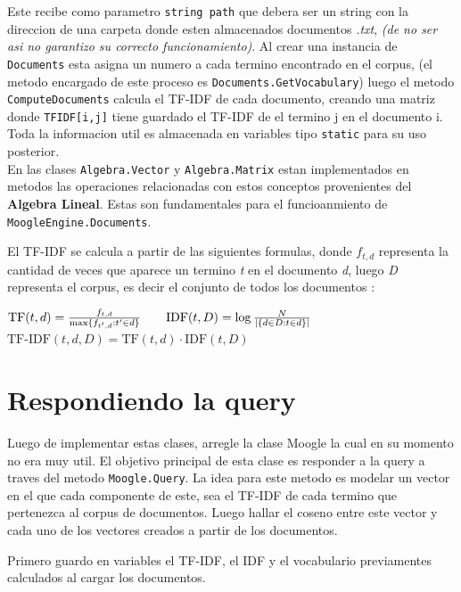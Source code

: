 \documentclass[10pt,a4paper]{report}
\begin{document}
\begin{flushleft}

    Este recibe como parametro \texttt{string path} que debera ser un string con la direccion de una carpeta donde esten almacenados documentos \emph{.txt}, \textit{(de no ser asi no garantizo su correcto funcionamiento)}. Al crear una instancia de \texttt{Documents} esta asigna un numero a cada termino encontrado en el corpus, (el metodo encargado de este proceso es \texttt{Documents.GetVocabulary}) luego el metodo \texttt{ComputeDocuments} calcula el TF-IDF de cada documento, creando una matriz donde \texttt{TFIDF[i,j]} tiene guardado el TF-IDF de el termino j en el documento i. Toda la informacion util es almacenada en variables tipo \texttt{static} para su uso posterior.\\

    En las clases \texttt{Algebra.Vector} y \texttt{Algebra.Matrix} estan implementados en metodos las operaciones relacionadas con estos conceptos provenientes del \textbf{Algebra Lineal}. Estas son fundamentales para el funcioanmiento de \texttt{MoogleEngine.Documents}.

    \vspace{10pt}
    
    El TF-IDF se calcula a partir de las siguientes formulas, donde \emph{$f_{t,d}$} representa la cantidad de veces que aparece un termino \emph{t} en el documento \emph{d}, luego \emph{D} representa el corpus, es decir el conjunto de todos los documentos :

\end{flushleft}

\begin{center}
    \begin{large}
        $
        \mathrm{TF}(t,d) = \frac{f_{t,d}}{\max\{f_{t',d}:t' \in d\}}\hspace{20pt}
        \mathrm{IDF}(t,D) = \log \frac{N}{|\{d \in D: t \in d\}|}\linebreak
        $
        $
        \mathrm{TF\text{-}IDF}(t,d,D) = \mathrm{TF}(t,d) \cdot \mathrm{IDF}(t,D)
        $
    \end{large}
\end{center}

\section{Respondiendo la query}

\begin{flushleft}
    Luego de implementar estas clases, arregle la clase Moogle la cual en su momento no era muy util. El objetivo principal de esta clase es responder a la query a traves del metodo \texttt{Moogle.Query}. La idea para este metodo es modelar un vector en el que cada componente de este, sea el TF-IDF de cada termino que pertenezca al corpus de documentos. Luego hallar el coseno entre este vector y cada uno de los vectores creados a partir de los documentos.

    Primero guardo en variables el TF-IDF, el IDF y el vocabulario previamentes calculados al cargar los documentos.
\end{flushleft}
\end{document}
